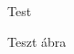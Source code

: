 \documentclass{article}
\begin{document}
\begin{figure}
\centering Test
\caption{Teszt \'abra}
\end{figure}
\end{document}

